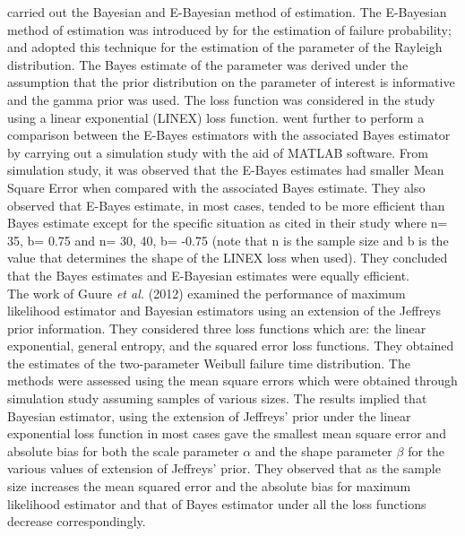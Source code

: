 \documentclass[a4paper,12pt]{report}
\newcommand{\para}{\hspace{0.5cm}}
\begin{document}
\noindent\para \cite{gupta2017bayesian} carried out the Bayesian and E-Bayesian method of estimation. The E-Bayesian method of estimation was introduced by \cite{Han2017} for the estimation of failure probability; and \cite{gupta2017bayesian} adopted this technique for the estimation of the parameter of the Rayleigh distribution. The Bayes estimate of the parameter was derived under the assumption that the prior distribution on the parameter of interest is informative and the gamma prior was used. The loss function was considered in the study using a linear exponential (LINEX) loss function. \cite{gupta2017bayesian} went further to perform a comparison between the E-Bayes estimators with the associated Bayes estimator by carrying out a simulation study with the aid of MATLAB software. From simulation study, it was observed that the E-Bayes estimates had smaller Mean Square Error when compared with the associated Bayes estimate. They also observed that E-Bayes estimate, in most cases, tended to be more efficient than Bayes estimate except for the specific situation as cited in their study where n= 35, b= 0.75 and n= 30, 40, b= -0.75 (note that n is the sample size and b is the value that determines the shape of the LINEX loss when used). They concluded that the Bayes estimates and E-Bayesian estimates were equally efficient.\\

\noindent\para The work of Guure \textit{et al.} (2012) examined the performance of maximum likelihood estimator and Bayesian estimators using an extension of the Jeffreys prior information. They considered three loss functions which are: the linear exponential, general entropy, and the squared error loss functions. They obtained the estimates of the two-parameter Weibull failure time distribution. The methods were assessed using the mean square errors which were obtained through simulation study assuming samples of various sizes. The results implied that Bayesian estimator, using the extension of Jeffreys’ prior under the linear exponential loss function in most cases gave the smallest mean square error and absolute bias for both the scale parameter $\alpha$ and the shape parameter $\beta$ for the various values of extension of Jeffreys’ prior. They observed that as the sample size increases the mean squared error and the absolute bias for maximum likelihood estimator and that of Bayes estimator under all the loss functions decrease correspondingly.\\
\end{document}
